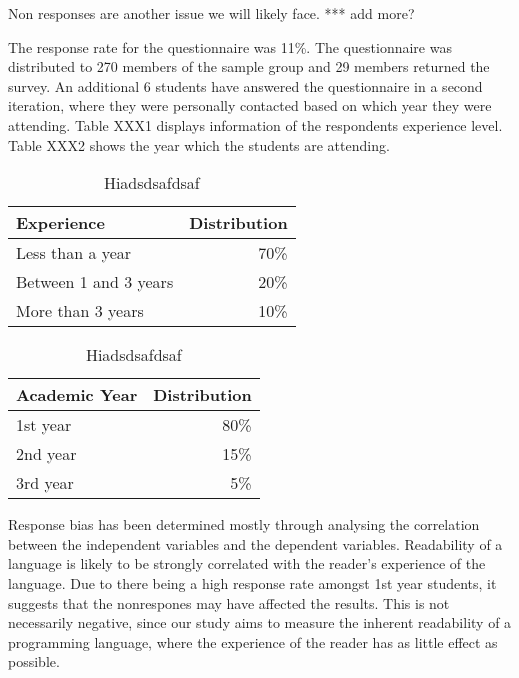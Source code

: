 \documentclass[times, 10pt,twocolumn]{IEEEtran}
\begin{document}
Non responses are another issue we will likely face. *** add more?


The response rate for the questionnaire was 11\%. The questionnaire was distributed to 270 members of the sample group and 29 members returned the survey. An additional 6 students have answered the questionnaire in a second iteration, where they were personally contacted based on which year they were attending. Table XXX1 displays information of the respondents experience level. Table XXX2 shows the year which the students are attending. 
\newline

\begin{table}[ht]
  \centering
  \begin{tabular}{| l | r |}
    \hline
    \textbf{Experience} & \textbf{Distribution} \\ \hline
    Less than a year & 70\% \\ \hline
    Between 1 and 3 years & 20\% \\ \hline
    More than 3 years & 10\% \\ 
    \hline
  \end{tabular}
  \caption{ Hiadsdsafdsaf}
\end{table}

\begin{table}[ht]
  \centering
  \begin{tabular}{| l | r |}
    \hline
    \textbf{Academic Year} & \textbf{Distribution} \\ \hline
    1st year & 80\% \\ \hline
    2nd year & 15\% \\ \hline
    3rd year & 5\% \\ 
    \hline
  \end{tabular}
  \caption{ Hiadsdsafdsaf}
\end{table}


Response bias has been determined mostly through analysing the correlation between the independent variables and the dependent variables. Readability of a language is likely to be strongly correlated with the reader's experience of the language. Due to there being a high response rate amongst 1st year students, it suggests that the nonrespones may have affected the results. This is not necessarily negative, since our study aims to measure the inherent readability of a programming language, where the experience of the reader has as little effect as possible. 
\newline
\end{document}
